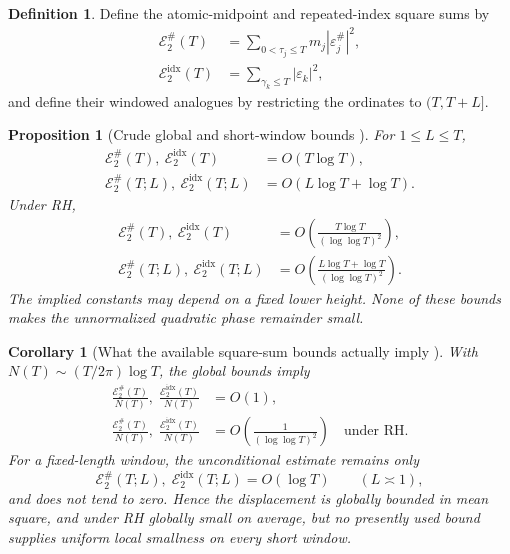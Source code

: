 \documentclass[11pt]{amsart}
\numberwithin{equation}{section}
\theoremstyle{plain}
\newtheorem{proposition}[theorem]{Proposition}
\newtheorem{corollary}[theorem]{Corollary}
\theoremstyle{definition}
\newtheorem{definition}[theorem]{Definition}
\theoremstyle{remark}
\newcommand{\1}{\mathbf{1}}
\begin{document}
\begin{definition}
\label{def:rvm_square_sums}
Define the atomic-midpoint and repeated-index square sums by
\begin{align}
\mathscr E_2^{\#}(T)
&=
\sum_{0<\tau_j\leq T}m_j|\varepsilon_j^{\#}|^2,
\label{eq:rvm_E2_atomic_global}
\\
\mathscr E_2^{\mathrm{idx}}(T)
&=
\sum_{\gamma_k\leq T}|\varepsilon_k|^2,
\label{eq:rvm_E2_index_global}
\end{align}
and define their windowed analogues by restricting the ordinates to
\((T,T+L]\).
\end{definition}


\begin{proposition}[Crude global and short-window bounds {}]
\label{prop:rvm_displacement_square_bounds}
For \(1\leq L\leq T\),
\begin{align}
\mathscr E_2^{\#}(T),\ \mathscr E_2^{\mathrm{idx}}(T)
&=O(T\log T),
\label{eq:rvm_E2_unconditional_global}
\\
\mathscr E_2^{\#}(T;L),\ \mathscr E_2^{\mathrm{idx}}(T;L)
&=O(L\log T+\log T).
\label{eq:rvm_E2_unconditional_window}
\end{align}
Under RH,
\begin{align}
\mathscr E_2^{\#}(T),\ \mathscr E_2^{\mathrm{idx}}(T)
&=
O\!\left(\frac{T\log T}{(\log\log T)^2}\right),
\label{eq:rvm_E2_RH_global}
\\
\mathscr E_2^{\#}(T;L),\ \mathscr E_2^{\mathrm{idx}}(T;L)
&=
O\!\left(
\frac{L\log T+\log T}{(\log\log T)^2}
\right).
\label{eq:rvm_E2_RH_window}
\end{align}
The implied constants may depend on a fixed lower height.  None of these
bounds makes the unnormalized quadratic phase remainder small.
\end{proposition}

\begin{corollary}[What the available square-sum bounds actually imply {}]
\label{cor:rvm_square_sum_interpretation}
With \(N(T)\sim (T/2\pi)\log T\), the global bounds imply
\begin{align}
\frac{\mathscr E_2^{\#}(T)}{N(T)},\;
\frac{\mathscr E_2^{\mathrm{idx}}(T)}{N(T)}
&=O(1),
\label{eq:rvm_global_mean_square_unconditional}
\\
\frac{\mathscr E_2^{\#}(T)}{N(T)},\;
\frac{\mathscr E_2^{\mathrm{idx}}(T)}{N(T)}
&=O\!\left(\frac1{(\log\log T)^2}\right)
\quad\text{under RH}.
\label{eq:rvm_global_mean_square_RH}
\end{align}
For a fixed-length window, the unconditional estimate remains only
\begin{equation}
\mathscr E_2^{\#}(T;L),\;
\mathscr E_2^{\mathrm{idx}}(T;L)=O(\log T)
\qquad(L\asymp1),
\label{eq:rvm_fixed_window_square_sum}
\end{equation}
and does not tend to zero.  Hence the displacement is globally bounded in
mean square, and under RH globally small on average, but no presently used
bound supplies uniform local smallness on every short window.
\end{corollary}
\end{document}
